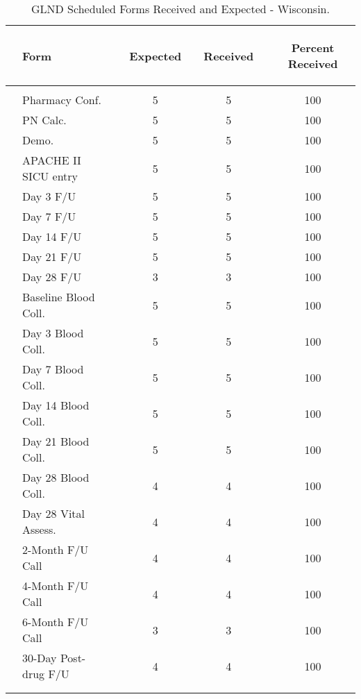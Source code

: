 \documentclass[dvips, 10pt]{article}
\begin{document}
\begin{table}[t]
\caption
{ GLND Scheduled Forms Received and Expected - Wisconsin. }
\begin{center}
\begin{tabular}{ @{}l@{}
@{}l@{}@{}p{1.5em}@{}@{}c@{}@{}p{1.5em}@{}@{}c@{}@{}p{1.5em}@{}@{}c@{}
}
\hline

& \parbox{6em}{\begin{center}Form\end{center}} && \parbox{6em}{\begin{center}Expected\end{center}} && \parbox{6em}{\begin{center}Received\end{center}} && \parbox{6em}{\begin{center}Percent Received\end{center}} \\

\hline

\\
& Pharmacy Conf. && 5 && 5 && 100 \\
& PN Calc. && 5 && 5 && 100 \\
& Demo. && 5 && 5 && 100 \\
& APACHE II SICU entry && 5 && 5 && 100 \\
& Day 3 F/U && 5 && 5 && 100 \\
& Day 7 F/U && 5 && 5 && 100 \\
& Day 14 F/U && 5 && 5 && 100 \\
& Day 21 F/U && 5 && 5 && 100 \\
& Day 28 F/U && 3 && 3 && 100 \\
& Baseline Blood Coll. && 5 && 5 && 100 \\
& Day 3 Blood Coll. && 5 && 5 && 100 \\
& Day 7 Blood Coll. && 5 && 5 && 100 \\
& Day 14 Blood Coll. && 5 && 5 && 100 \\
& Day 21 Blood Coll. && 5 && 5 && 100 \\
& Day 28 Blood Coll. && 4 && 4 && 100 \\
& Day 28 Vital Assess. && 4 && 4 && 100 \\
& 2-Month F/U Call && 4 && 4 && 100 \\
& 4-Month F/U Call && 4 && 4 && 100 \\
& 6-Month F/U Call && 3 && 3 && 100 \\
& 30-Day Post-drug F/U && 4 && 4 && 100 \\
\\
\hline \\

\end{tabular}

\end{center}
 \end{table}
\end{document}
